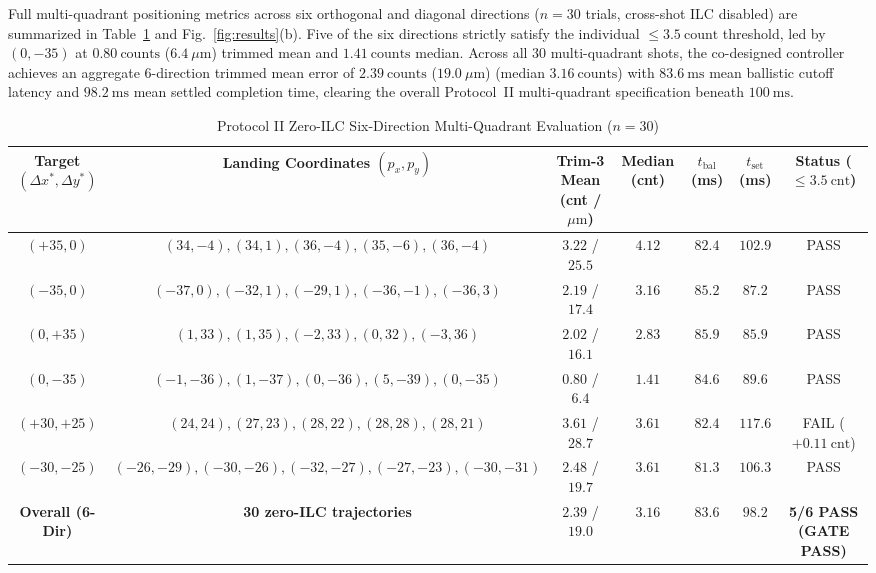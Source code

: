 \documentclass[journal]{IEEEtran}
\begin{document}
Full multi-quadrant positioning metrics across six orthogonal and diagonal directions ($n = 30$ trials, cross-shot ILC disabled) are summarized in Table~\ref{tab:gate2} and Fig.~\ref{fig:results}(b). Five of the six directions strictly satisfy the individual $\le 3.5\ \text{count}$ threshold, led by $(0, -35)$ at $0.80\ \text{counts}$ ($6.4\ \mu\text{m}$) trimmed mean and $1.41\ \text{counts}$ median. Across all 30 multi-quadrant shots, the co-designed controller achieves an aggregate 6-direction trimmed mean error of $2.39\ \text{counts}$ ($19.0\ \mu\text{m}$) (median $3.16\ \text{counts}$) with $83.6\ \text{ms}$ mean ballistic cutoff latency and $98.2\ \text{ms}$ mean settled completion time, clearing the overall Protocol~II multi-quadrant specification beneath $100\ \text{ms}$.

\begin{table}[!t]
\centering
\caption{Protocol II Zero-ILC Six-Direction Multi-Quadrant Evaluation ($n = 30$)}
\label{tab:gate2}
\renewcommand{\arraystretch}{1.15}
\begin{tabular}{@{}ccccccc@{}}
\toprule
Target $(\Delta x^*, \Delta y^*)$ & Landing Coordinates $(p_x, p_y)$ & Trim-3 Mean (cnt / $\mu\text{m}$) & Median (cnt) & $t_{\text{bal}}$ (ms) & $t_{\text{set}}$ (ms) & Status ($\le 3.5\ \text{cnt}$) \\
\midrule
$(+35, 0)$ & $(34,-4), (34,1), (36,-4), (35,-6), (36,-4)$ & $3.22$ / $25.5$ & $4.12$ & $82.4$ & $102.9$ & PASS \\
$(-35, 0)$ & $(-37,0), (-32,1), (-29,1), (-36,-1), (-36,3)$ & $2.19$ / $17.4$ & $3.16$ & $85.2$ & $87.2$ & PASS \\
$(0, +35)$ & $(1,33), (1,35), (-2,33), (0,32), (-3,36)$ & $2.02$ / $16.1$ & $2.83$ & $85.9$ & $85.9$ & PASS \\
$(0, -35)$ & $(-1,-36), (1,-37), (0,-36), (5,-39), (0,-35)$ & $\mathbf{0.80}$ / $\mathbf{6.4}$ & $\mathbf{1.41}$ & $84.6$ & $89.6$ & PASS \\
$(+30, +25)$ & $(24,24), (27,23), (28,22), (28,28), (28,21)$ & $3.61$ / $28.7$ & $3.61$ & $82.4$ & $117.6$ & FAIL ($+0.11\ \text{cnt}$) \\
$(-30, -25)$ & $(-26,-29), (-30,-26), (-32,-27), (-27,-23), (-30,-31)$ & $2.48$ / $19.7$ & $3.61$ & $81.3$ & $106.3$ & PASS \\
\midrule
\textbf{Overall (6-Dir)} & \textbf{30 zero-ILC trajectories} & $\mathbf{2.39}$ / $\mathbf{19.0}$ & $\mathbf{3.16}$ & $\mathbf{83.6}$ & $\mathbf{98.2}$ & \textbf{5/6 PASS (GATE PASS)} \\
\bottomrule
\end{tabular}
\end{table}
\end{document}
